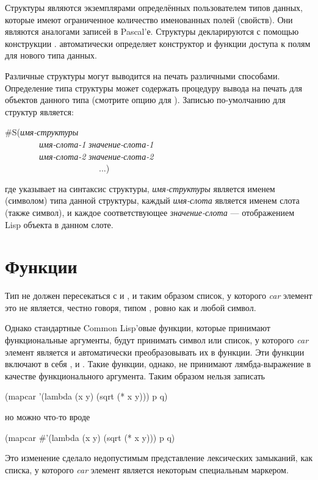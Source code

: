 Структуры являются экземплярами определённых пользователем типов данных, которые
имеют ограниченное количество именованных полей (свойств). Они являются
аналогами записей в Pascal'е.
Структуры декларируются с помощью конструкции . 
автоматически определяет конструктор и функции доступа к полям для нового типа
данных.

Различные структуры могут выводится на печать различными способами.
Определение типа структуры может содержать процедуру вывода на печать для
объектов данного типа (смотрите опцию  для ).
Записью по-умолчанию для структур является:
\begin{lisp}
\#S(\emph{имя-структуры} \\
~~~~~~~~\emph{имя-слота-1} \emph{значение-слота-1} \\
~~~~~~~~\emph{имя-слота-2} \emph{значение-слота-2} \\
~~~~~~~~~~~~~~~~~~~~~~...)
\end{lisp}
где  указывает на синтаксис структуры, \emph{имя-структуры} является
именем (символом) типа данной структуры, каждый \emph{имя-слота} является именем
слота (также символ), и каждое соответствующее \emph{значение-слота} ---
отображением Lisp объекта в данном слоте.

\section{Функции}
Тип  не должен пересекаться с
 и , и таким образом список, у которого \emph{car} элемент
это не является, честно говоря, типом , ровно
как и любой символ.

Однако стандартные Common Lisp'овые функции, которые принимают функциональные
аргументы, будут принимать символ или список, у которого \emph{car} элемент
является  и автоматически преобразовывать их в функции. Эти функции
включают в себя ,  и .
Такие функции, однако, не принимают лямбда-выражение в качестве функционального
аргумента. Таким образом нельзя записать
\vskip 3pt
\begin{lisp}
(mapcar '(lambda (x y) (sqrt (* x y))) p q)
\end{lisp}
но можно что-то вроде
\begin{lisp}
(mapcar \#'(lambda (x y) (sqrt (* x y))) p q)
\end{lisp}

Это изменение сделало недопустимым представление лексических замыканий, как
списка, у которого \emph{car} элемент является некоторым специальным маркером.

